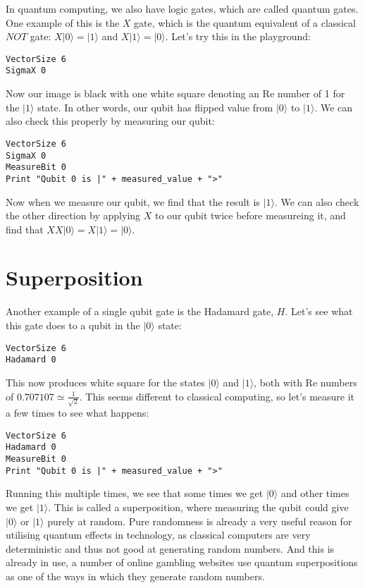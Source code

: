 \documentclass[twocolumn]{article}
\begin{document}
In quantum computing, we also have logic gates, which are called quantum gates. One example of this is the $X$ gate, which is the quantum equivalent of a classical $NOT$ gate: $X|0\rangle = |1\rangle$ and $X|1\rangle = |0\rangle$. Let's try this in the playground:

\begin{lstlisting}
VectorSize 6
SigmaX 0
\end{lstlisting}

Now our image is black with one white square denoting an Re number of 1 for the $|1\rangle$ state. In other words, our qubit has flipped value from $|0\rangle$ to $|1\rangle$. We can also check this properly by measuring our qubit:

\begin{lstlisting}
VectorSize 6
SigmaX 0
MeasureBit 0
Print "Qubit 0 is |" + measured_value + ">"
\end{lstlisting}

Now when we measure our qubit, we find that the result is $|1\rangle$. We can also check the other direction by applying $X$ to our qubit twice before measureing it, and find that $XX|0\rangle = X|1\rangle = |0\rangle$.

\section{Superposition}

Another example of a single qubit gate is the Hadamard gate, $H$. Let's see what this gate does to a qubit in the $|0\rangle$ state:

\begin{lstlisting}
VectorSize 6
Hadamard 0
\end{lstlisting}

This now produces white square for the states $|0\rangle$ and $|1\rangle$, both with Re numbers of $0.707107 \simeq \frac{1}{\sqrt{2}}$. This seems different to classical computing, so let's measure it a few times to see what happens:

\begin{lstlisting}
VectorSize 6
Hadamard 0
MeasureBit 0
Print "Qubit 0 is |" + measured_value + ">"
\end{lstlisting}

Running this multiple times, we see that some times we get $|0\rangle$ and other times we get $|1\rangle$. This is called a superposition, where measuring the qubit could give $|0\rangle$ or $|1\rangle$ purely at random. Pure randomness is already a very useful reason for utilising quantum effects in technology, as classical computers are very deterministic and thus not good at generating random numbers. And this is already in use, a number of online gambling websites use quantum superpositions as one of the ways in which they generate random numbers.
\end{document}

